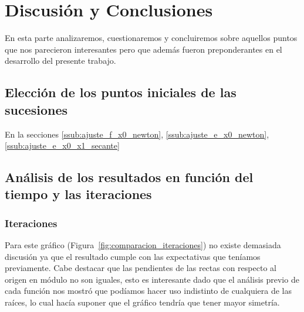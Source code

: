 \section{Discusión y Conclusiones}

En esta parte analizaremos, cuestionaremos y concluiremos sobre aquellos puntos que nos parecieron interesantes pero que además fueron preponderantes en el desarrollo del presente trabajo.

\subsection{Elección de los puntos iniciales de las sucesiones} %
\label{sub:elecci_n_de_los_puntos_iniciales_de_las_sucesiones}

En la secciones \ref{ssub:ajuste_f_x0_newton}, \ref{ssub:ajuste_e_x0_newton}, \ref{ssub:ajuste_e_x0_x1_secante}


\subsection{Análisis de los resultados en función del tiempo y las iteraciones} %
\label{sub:an_lisis_de_los_resultados_en_funci_n_del_tiempo_y_las_iteraciones}

\subsubsection{Iteraciones} %
\label{ssub:iteraciones}

Para este gráfico (Figura~\ref{fig:comparacion_iteraciones}) no existe demasiada discusión ya que el resultado cumple con las expectativas que teníamos previamente. Cabe destacar que las pendientes de las rectas con respecto al origen en módulo no son iguales, esto es interesante dado que el análisis previo de cada función nos mostró que podíamos hacer uso indistinto de cualquiera de las raíces, lo cual hacía suponer que el gráfico tendría que tener mayor simetría.

